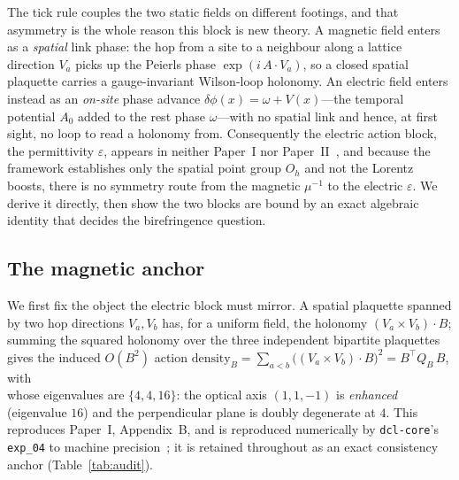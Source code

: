%
%

\label{sec:electric_block}

The tick rule couples the two static fields on different footings, and that
asymmetry is the whole reason this block is new theory. A magnetic field enters
as a \emph{spatial} link phase: the hop from a site to a neighbour along a
lattice direction $V_a$ picks up the Peierls phase $\exp(i\,A\!\cdot\!V_a)$, so a
closed spatial plaquette carries a gauge-invariant Wilson-loop holonomy. An
electric field enters instead as an \emph{on-site} phase advance
$\delta\phi(x)=\omega+V(x)$---the temporal potential $A_0$ added to the rest
phase $\omega$---with no spatial link and hence, at first sight, no loop to read
a holonomy from. Consequently the electric action block, the permittivity
$\varepsilon$, appears in neither Paper~I nor Paper~II~\cite{PaperI,PaperII}, and
because the framework establishes only the spatial point group $O_h$ and not the
Lorentz boosts, there is no symmetry route from the magnetic $\mu^{-1}$ to the
electric $\varepsilon$. We derive it directly, then show the two blocks are bound
by an exact algebraic identity that decides the birefringence question.

\subsection{The magnetic anchor}
\label{subsec:magnetic_anchor}

We first fix the object the electric block must mirror. A spatial plaquette
spanned by two hop directions $V_a,V_b$ has, for a uniform field, the holonomy
$(V_a\!\times\!V_b)\!\cdot\!B$; summing the squared holonomy over the three
independent bipartite plaquettes gives the induced $O(B^2)$ action
$\text{density}_B=\sum_{a<b}\bigl((V_a\!\times\!V_b)\!\cdot\!B\bigr)^2=B^{\!\top}
Q_B\,B$, with
%
\begin{equation}
    \label{eq:magnetic_Q}
    
\end{equation}
%
whose eigenvalues are $\{4,4,16\}$: the optical axis $(1,1,-1)$ is
\emph{enhanced} (eigenvalue $16$) and the perpendicular plane is doubly
degenerate at $4$. This reproduces Paper~I, Appendix~B, and is reproduced
numerically by \texttt{dcl-core}'s \texttt{exp\_04} to machine
precision~\cite{PaperI,dclcore}; it is retained throughout as an exact
consistency anchor (Table~\ref{tab:audit}).

